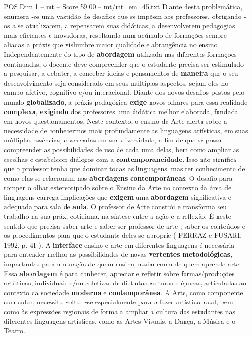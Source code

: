 \begin{textsample}{POS Dim 1 – mt – Score 59.00 – mt/mt\_em\_45.txt}
Diante desta problemática, enumera -se uma vastidão de desafios que se impõem aos professores, obrigando -os a se atualizarem, a repensarem suas didáticas, a desenvolverem pedagogias mais eficientes e inovadoras, resultando num acúmulo de formações sempre aliadas a práxis que vislumbre maior qualidade e abrangência no ensino.
Independentemente do tipo de \textbf{abordagem} utilizada nas diferentes formações continuadas, o docente deve compreender que o estudante precisa ser estimulado a pesquisar, a debater, a conceber ideias e pensamentos de \textbf{maneira} que o seu desenvolvimento seja considerado em seus múltiplos aspectos, sejam eles no campo afetivo, cognitivo e/ou interacional.
Diante dos novos desafios postos pelo mundo \textbf{globalizado}, a práxis pedagógica \textbf{exige} novos olhares para essa realidade \textbf{complexa}, \textbf{exigindo} dos professores uma didática melhor elaborada, fundada em novos questionamentos.
Neste contexto, o ensino da Arte alerta sobre a necessidade de conhecermos mais profundamente as linguagens artísticas, em suas múltiplas essências, observadas em sua diversidade, a fim de que se possa compreender as possibilidades de uso de cada uma delas, bem como ampliar as escolhas e estabelecer diálogos com a \textbf{contemporaneidade}.
Isso não significa que o professor tenha que dominar todas as linguagens, mas ter conhecimento de como elas se relacionam nas \textbf{abordagens} \textbf{contemporâneas}.
O desafio para romper o olhar estereotipado sobre o Ensino da Arte no contexto da área de linguagens carrega implicações que \textbf{exigem} uma \textbf{abordagem} significativa e adequada para sala de \textbf{aula}.
O professor de Arte constrói e transforma seu trabalho na sua práxi cotidiana, na síntese entre a ação e a reflexão.
É neste sentido que precisa saber arte e saber ser professor de arte ; saber os conteúdos e os procedimentos para que o estudante deles se aproprie ( FERRAZ e FUSARI, 1992, p. 41 ).
A \textbf{interface} ensino e arte em diferentes linguagens é necessária para entender melhor as possibilidades de novas \textbf{vertentes} \textbf{metodológicas}, importantes para a atuação de quem ensina, assim como de quem aprende arte.
Essa \textbf{abordagem} é para conhecer, apreciar e refletir sobre formas/produções artísticas, individuais e/ou coletivas de distintas culturas e épocas, articuladas ao contexto da sociedade \textbf{moderna} e \textbf{contemporânea}.
A Arte, como componente curricular, necessita voltar -se especialmente para o fazer artístico local, bem como às expressões regionais de forma a ampliar a cultura dos estudantes nas diferentes linguagens artísticas, como as Artes Visuais, a Dança, a Música e o Teatro.

\end{textsample}
